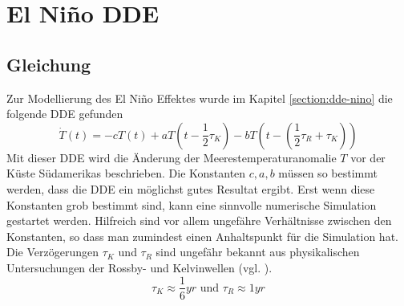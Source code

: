 \section{El Niño DDE}


\subsection{Gleichung}
Zur Modellierung des El Niño Effektes wurde im Kapitel \ref{section:dde-nino} die folgende DDE gefunden
\begin{equation} \label{eldde}
\dot{T}(t)=-cT(t)+aT(t-\frac{1}{2}\tau_K)-bT(t-(\frac{1}{2}\tau_R+\tau_K))
\end{equation}
Mit dieser DDE wird die Änderung der Meerestemperaturanomalie $T$ vor der Küste Südamerikas beschrieben.
Die Konstanten $c,a,b$ müssen so bestimmt werden, dass die DDE ein möglichst gutes Resultat ergibt.
Erst wenn diese Konstanten grob bestimmt sind, kann eine sinnvolle numerische Simulation gestartet werden.
Hilfreich sind vor allem ungefähre Verhältnisse zwischen den Konstanten, so dass man zumindest einen Anhaltspunkt für die Simulation hat.
Die Verzögerungen $\tau_K$ und $\tau_R$ sind ungefähr bekannt aus physikalischen Untersuchungen der Rossby- und Kelvinwellen (vgl. \cite[Kaper]{verzoegert:kaperengler}).
\begin{equation}
	\tau_K \approx \frac{1}{6}yr \text{ und } \tau_R \approx 1 yr
\end{equation}


